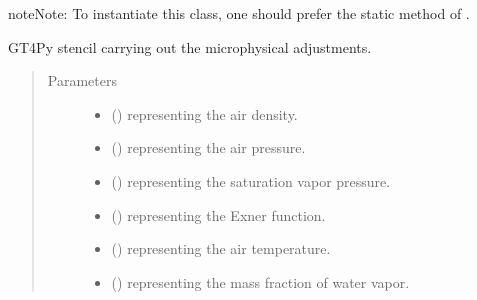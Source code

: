 \documentclass[letterpaper,10pt,english]{sphinxmanual}
\begin{document}
\begin{fulllineitems}
\begin{fulllineitems}
\begin{sphinxadmonition}{note}{Note:}
To instantiate this class, one should prefer the static method
 of
.
\end{sphinxadmonition}

\end{fulllineitems}


\begin{fulllineitems}
\label{\detokenize{api:parameterizations.adjustment_microphysics_kessler_wrf.AdjustmentMicrophysicsKesslerWRF._stencil_adjustment_defs}}
GT4Py stencil carrying out the microphysical adjustments.
\begin{quote}\begin{description}
\item[{Parameters}] \leavevmode\begin{itemize}
\item {} 
 () \textendash{}  representing the air density.

\item {} 
 () \textendash{}  representing the air pressure.

\item {} 
 () \textendash{}  representing the saturation vapor pressure.

\item {} 
 () \textendash{}  representing the Exner function.

\item {} 
 () \textendash{}  representing the air temperature.

\item {} 
 () \textendash{}  representing the mass fraction of water vapor.


\end{itemize}
\end{description}
\end{quote}
\end{fulllineitems}
\end{fulllineitems}
\end{document}
